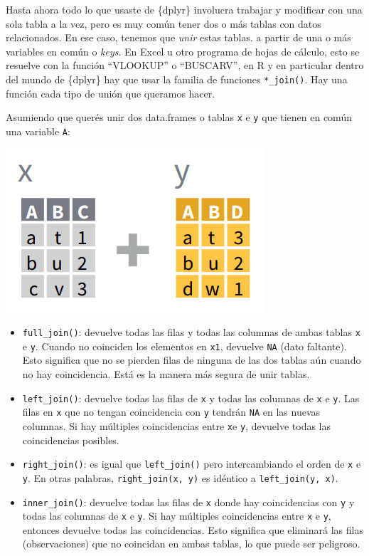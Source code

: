 \documentclass[
  openany]{book}
\begin{document}
Hasta ahora todo lo que usaste de \{dplyr\} involucra trabajar y modificar con una sola tabla a la vez, pero es muy común tener dos o más tablas con datos relacionados.
En ese caso, tenemos que \emph{unir} estas tablas.
a partir de una o más variables en común o \emph{keys}.
En Excel u otro programa de hojas de cálculo, esto se resuelve con la función ``VLOOKUP'' o ``BUSCARV'', en R y en particular dentro del mundo de \{dplyr\} hay que usar la familia de funciones \texttt{*\_join()}.
Hay una función cada tipo de unión que queramos hacer.

Asumiendo que querés unir dos data.frames o tablas \texttt{x} e \texttt{y} que tienen en común una variable \texttt{A}:

\includegraphics{img/join.png}

\begin{itemize}
\item
  \texttt{full\_join()}: devuelve todas las filas y todas las columnas de ambas tablas \texttt{x} e \texttt{y}.
  Cuando no coinciden los elementos en \texttt{x1}, devuelve \texttt{NA} (dato faltante).
  Esto significa que no se pierden filas de ninguna de las dos tablas aún cuando no hay coincidencia.
  Está es la manera más segura de unir tablas.
\item
  \texttt{left\_join()}: devuelve todas las filas de \texttt{x} y todas las columnas de \texttt{x} e \texttt{y}.
  Las filas en \texttt{x} que no tengan coincidencia con \texttt{y} tendrán \texttt{NA} en las nuevas columnas.
  Si hay múltiples coincidencias entre \texttt{x}e \texttt{y}, devuelve todas las coincidencias posibles.
\item
  \texttt{right\_join()}: es igual que \texttt{left\_join()} pero intercambiando el orden de \texttt{x} e \texttt{y}.
  En otras palabras, \texttt{right\_join(x,\ y)} es idéntico a \texttt{left\_join(y,\ x)}.
\item
  \texttt{inner\_join()}: devuelve todas las filas de \texttt{x} donde hay coincidencias con \texttt{y} y todas las columnas de \texttt{x} e \texttt{y}.
  Si hay múltiples coincidencias entre \texttt{x} e \texttt{y}, entonces devuelve todas las coincidencias.
  Esto significa que eliminará las filas (observaciones) que no coincidan en ambas tablas, lo que puede ser peligroso.
\end{itemize}
\end{document}
